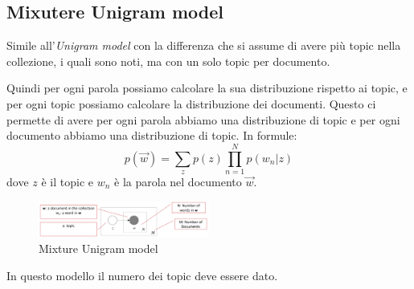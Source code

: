 \subsection{Mixutere Unigram model}
Simile all'\textit{Unigram model} con la differenza che si assume di avere più
topic nella collezione, i quali sono noti, ma con un solo topic per documento.

Quindi per ogni parola possiamo calcolare la sua distribuzione rispetto ai topic,
e per ogni topic possiamo calcolare la distribuzione dei documenti. Questo ci
permette di avere per ogni parola abbiamo una distribuzione di topic e per ogni
documento abbiamo una distribuzione di topic. In formule:
\begin{equation}
      p(\vec{w}) = \sum_z p(z) \prod_{n = 1}^{N} p(w_n|z)
\end{equation}
dove $z$ è il topic e $w_n$ è la parola nel documento $\vec{w}$.
\begin{figure}[!ht]
      \centering
      \includegraphics[width=0.5\textwidth]{./img/nlp/mixture.png}
      \caption{Mixture Unigram model}
      \label{fig:mixture_unigram}
\end{figure}
\begin{nota}
      In questo modello il numero dei topic deve essere dato.
\end{nota}
